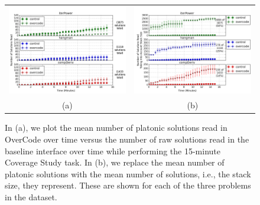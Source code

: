 \documentclass[12pt,twoside]{mitthesis}
\begin{document}
\begin{figure}[b!]
\begin{tabular}{c | c}
\begin{minipage}{.5\linewidth}
\centering
\includegraphics[width=\linewidth]{Body/figures/overcode/prettyReadCoverage.png}
\end{minipage}
&
\begin{minipage}{.5\linewidth}
\centering
\includegraphics[width=\linewidth]{Body/figures/overcode/prettyPercentCoverage.png}
\end{minipage}
\\
(a) & (b)
\end{tabular}
\caption{In (a), we plot the mean number of platonic solutions read in OverCode over time versus the number of raw solutions read in the baseline interface over time while performing the 15-minute Coverage Study task. In (b), we replace the mean number of platonic solutions with the mean number of solutions, i.e., the stack size, they represent. These are shown for each of the three problems in the dataset.}
\label{readCoverage}
\end{figure}
\end{document}

